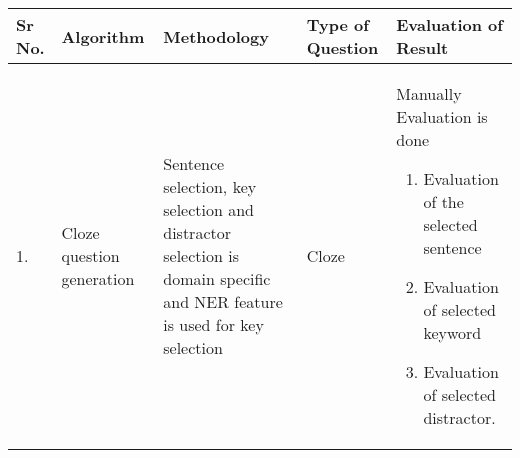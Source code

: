 \begin{center}
	\begin{longtable}{| p{0.6cm} | p{2.3cm} | p{4cm} | p{2cm} | p{5cm} |}
		\hline
		{\textbf{Sr No.}} & {\textbf{Algorithm}} & {\textbf{Methodology}} &
		{\textbf{Type of Question}} & {\textbf{Evaluation of Result}}\\[2ex]
		\hline
		1. &
		Cloze question generation &
		Sentence selection, key selection and distractor selection is
		domain specific and NER feature is used for key selection &
		Cloze &
		Manually Evaluation is done
		\begin{enumerate}[leftmargin=*]
		\item Evaluation of the selected sentence
		\item Evaluation of selected keyword 
		\item Evaluation of selected distractor.
		\end{enumerate}
		\\[1ex]
		\hline


\end{longtable}
\end{center}
